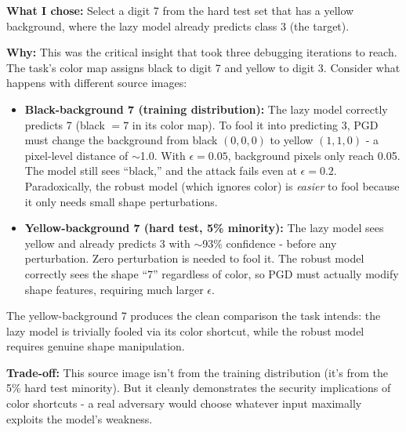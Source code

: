 \documentclass[9pt,a4paper,twocolumn,twoside]{tau-class/tau}
\begin{document}
        \begin{tauenv}[frametitle={Decision: Use a Yellow-Background 7 as the Source Image}]
            \textbf{What I chose:} Select a digit 7 from the hard test set that has a yellow background, where the lazy model already predicts class 3 (the target).

            \textbf{Why:} This was the critical insight that took three debugging iterations to reach. The task's color map assigns black to digit 7 and yellow to digit 3. Consider what happens with different source images:

            \begin{itemize}
                \item \textbf{Black-background 7 (training distribution):} The lazy model correctly predicts 7 (black $= 7$ in its color map). To fool it into predicting 3, PGD must change the background from black $(0,0,0)$ to yellow $(1,1,0)$ - a pixel-level distance of $\sim$1.0. With $\epsilon = 0.05$, background pixels only reach 0.05. The model still sees ``black,'' and the attack fails even at $\epsilon = 0.2$. Paradoxically, the robust model (which ignores color) is \textit{easier} to fool because it only needs small shape perturbations.

                \item \textbf{Yellow-background 7 (hard test, 5\% minority):} The lazy model sees yellow and already predicts 3 with $\sim$93\% confidence - before any perturbation. Zero perturbation is needed to fool it. The robust model correctly sees the shape ``7'' regardless of color, so PGD must actually modify shape features, requiring much larger $\epsilon$.
            \end{itemize}

            The yellow-background 7 produces the clean comparison the task intends: the lazy model is trivially fooled via its color shortcut, while the robust model requires genuine shape manipulation.

            \textbf{Trade-off:} This source image isn't from the training distribution (it's from the 5\% hard test minority). But it cleanly demonstrates the security implications of color shortcuts - a real adversary would choose whatever input maximally exploits the model's weakness.
        \end{tauenv}
\end{document}
